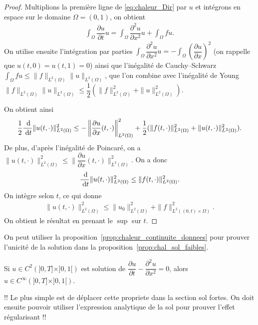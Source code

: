 \documentclass[12pt,a4paper,twoside]{article}
\begin{document}
\begin{proof}
  Multiplions la premi\`ere ligne de \eqref{eq:chaleur_Dir} par $u$
  et int\'egrons en espace sur le domaine $\Omega = (0,1)$,
  on obtient
  \begin{align*}
    \int_{\Omega} \dfrac{\partial u}{\partial t} u = \int_{\Omega} \dfrac{\partial^2 u}{\partial x^2} u 
    + \int_{\Omega} f u .
  \end{align*}
  On utilise ensuite l'int\'egration par parties 
  $\int_{\Omega} \dfrac{\partial^2 u}{\partial x^2} u  
  = - \int_{\Omega} \left(\dfrac{\partial u}{\partial x} \right)^2$
  (on rappelle que $u(t,0) = u(t,1) = 0$)
  ainsi que l'in\'egalit\'e de Cauchy--Schwarz 
  $\int_{\Omega} f u \leq \| f \|_{L^2(\Omega)} \| u \|_{L^2(\Omega)}$,
  que l'on combine avec l'in\'egalit\'e de Young 
  $\| f \|_{L^2(\Omega)} \| u \|_{L^2(\Omega)} \leq \dfrac{1}{2} (\| f \|_{L^2(\Omega)}^2 +  \| u \|_{L^2(\Omega)}^2)$.
  
  On obtient ainsi
  \begin{align*}
    \dfrac{1}{2} \dfrac{\;\mathrm{d}}{\;\mathrm{d} t} \| u(t,\cdot) \|_{L^2(\Omega)}^2
    \leq - \left\| \dfrac{\partial u}{\partial x} (t,\cdot) \right\|_{L^2(\Omega)}^2
    + \dfrac{1}{2}  (\| f (t,\cdot) \|_{L^2(\Omega)}^2 +  \| u (t,\cdot) \|_{L^2(\Omega)}^2) .
  \end{align*}
  De plus, d'apr\`es l'in\'egalit\'e de Poincar\'e, on a 
  $\| u (t,\cdot) \|_{L^2(\Omega)}^2 \leq \| \dfrac{\partial u}{\partial x} (t,\cdot) \|_{L^2(\Omega)}^2$.
  On a donc 
  \begin{align*}
    \dfrac{\;\mathrm{d}}{\;\mathrm{d} t} \| u(t,\cdot) \|_{L^2(\Omega)}^2 \leq \| f (t,\cdot) \|_{L^2(\Omega)}^2 .
  \end{align*}
  On int\`egre selon $t$, ce qui donne
  \begin{align*}
    \| u(t,\cdot) \|_{L^2(\Omega)}^2 \leq \| u_0 \|_{L^2(\Omega)}^2 + \| f \|_{L^2((0,t) \times \Omega)}^2 .
  \end{align*}
  On obtient le r\'esultat en prenant le $\sup$ sur $t$.
\end{proof}

\begin{remark}
  On peut utiliser la proposition~\ref{prop:chaleur_continuite_donnees}
  pour prouver l'unicit\'e de la solution dans la
  proposition~\ref{prop:chal_sol_faibles}.
\end{remark}

\begin{proposition}
  Si $u \in C^2(]0,T] \times ]0,1[)$ est solution de
  $\dfrac{\partial u}{\partial t} - \dfrac{\partial^2 u}{\partial x^2} = 0$,
  alors $u \in C^{\infty}(]0,T] \times ]0,1[)$.
\end{proposition}
!! Le plus simple est de d\'eplacer cette propriete dans la section sol fortes.
On doit ensuite pouvoir utiliser l'expression analytique de la sol
pour prouver l'effet r\'egularisant !!
\end{document}
